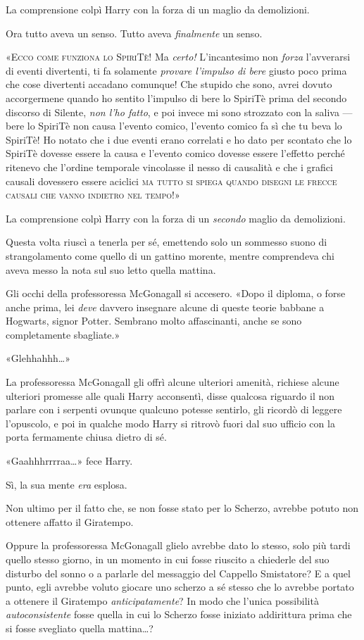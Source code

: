 La comprensione colpì Harry con la forza di un maglio da demolizioni.

Ora tutto aveva un senso. Tutto aveva \textit{finalmente} un senso.

«\textsc{Ecco come funziona lo SpiriTè!} Ma \textit{certo!} L’incantesimo non \textit{forza} l’avverarsi di eventi divertenti, ti fa solamente \textit{provare l’impulso di bere} giusto poco prima che cose divertenti accadano comunque! Che stupido che sono, avrei dovuto accorgermene quando ho sentito l’impulso di bere lo SpiriTè prima del secondo discorso di Silente, \textit{non l’ho fatto}, e poi invece mi sono strozzato con la saliva — bere lo SpiriTè non causa l’evento comico, l’evento comico fa sì che tu beva lo SpiriTè! Ho notato che i due eventi erano correlati e ho dato per scontato che lo SpiriTè dovesse essere la causa e l’evento comico dovesse essere l’effetto perché ritenevo che l’ordine temporale vincolasse il nesso di causalità e che i grafici causali dovessero essere aciclici \textsc{ma tutto si spiega quando disegni le frecce causali che vanno indietro nel tempo!}»

La comprensione colpì Harry con la forza di un \textit{secondo} maglio da demolizioni.

Questa volta riuscì a tenerla per sé, emettendo solo un sommesso suono di strangolamento come quello di un gattino morente, mentre comprendeva chi aveva messo la nota sul suo letto quella mattina.

Gli occhi della professoressa McGonagall si accesero. «Dopo il diploma, o forse anche prima, lei \textit{deve} davvero insegnare alcune di queste teorie babbane a Hogwarts, signor Potter. Sembrano molto affascinanti, anche se sono completamente sbagliate.»

«Glehhahhh…»

La professoressa McGonagall gli offrì alcune ulteriori amenità, richiese alcune ulteriori promesse alle quali Harry acconsentì, disse qualcosa riguardo il non parlare con i serpenti ovunque qualcuno potesse sentirlo, gli ricordò di leggere l’opuscolo, e poi in qualche modo Harry si ritrovò fuori dal suo ufficio con la porta fermamente chiusa dietro di sé.

«Gaahhhrrrraa…» fece Harry.

Sì, la sua mente \textit{era} esplosa.

Non ultimo per il fatto che, se non fosse stato per lo Scherzo, avrebbe potuto non ottenere affatto il Giratempo.

Oppure la professoressa McGonagall glielo avrebbe dato lo stesso, solo più tardi quello stesso giorno, in un momento in cui fosse riuscito a chiederle del suo disturbo del sonno o a parlarle del messaggio del Cappello Smistatore? E a quel punto, egli avrebbe voluto giocare uno scherzo a sé stesso che lo avrebbe portato a ottenere il Giratempo \textit{anticipatamente}? In modo che l’unica possibilità \textit{autoconsistente} fosse quella in cui lo Scherzo fosse iniziato addirittura prima che si fosse svegliato quella mattina…?

